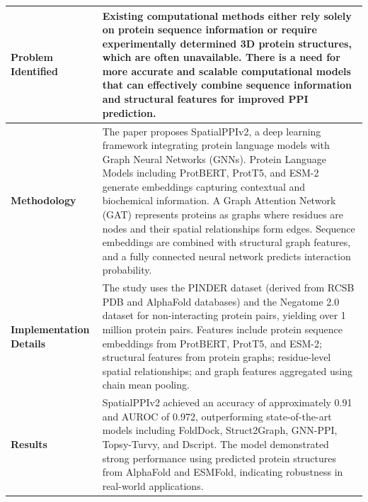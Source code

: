 \documentclass[12pt,a4paper]{report}
\begin{document}
\begin{table}[H]
\centering
\renewcommand{\arraystretch}{1.5}
\begin{tabular}{|p{}|p{}|}
\hline
\textbf{Problem Identified} & Existing computational methods either rely solely on protein sequence information or require experimentally determined 3D protein structures, which are often unavailable. There is a need for more accurate and scalable computational models that can effectively combine sequence information and structural features for improved PPI prediction. \\ \hline
\textbf{Methodology} & The paper proposes SpatialPPIv2, a deep learning framework integrating protein language models with Graph Neural Networks (GNNs). Protein Language Models including ProtBERT, ProtT5, and ESM-2 generate embeddings capturing contextual and biochemical information. A Graph Attention Network (GAT) represents proteins as graphs where residues are nodes and their spatial relationships form edges. Sequence embeddings are combined with structural graph features, and a fully connected neural network predicts interaction probability. \\ \hline
\textbf{Implementation Details} & The study uses the PINDER dataset (derived from RCSB PDB and AlphaFold databases) and the Negatome 2.0 dataset for non-interacting protein pairs, yielding over 1 million protein pairs. Features include protein sequence embeddings from ProtBERT, ProtT5, and ESM-2; structural features from protein graphs; residue-level spatial relationships; and graph features aggregated using chain mean pooling. \\ \hline
\textbf{Results} & SpatialPPIv2 achieved an accuracy of approximately 0.91 and AUROC of 0.972, outperforming state-of-the-art models including FoldDock, Struct2Graph, GNN-PPI, Topsy-Turvy, and Dscript. The model demonstrated strong performance using predicted protein structures from AlphaFold and ESMFold, indicating robustness in real-world applications. \\ \hline
\end{tabular}
\end{table}

\newpage
\end{document}
